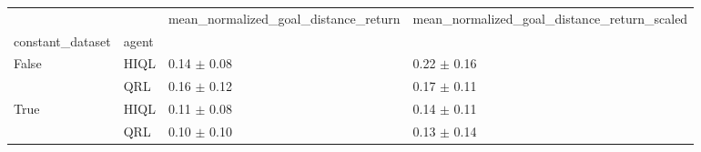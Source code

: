 \begin{tabular}{llll}
\toprule
 &  & mean_normalized_goal_distance_return & mean_normalized_goal_distance_return_scaled \\
constant_dataset & agent &  &  \\
\midrule
\multirow[t]{2}{*}{False} & HIQL & 0.14 $\pm$ 0.08 & 0.22 $\pm$ 0.16 \\
 & QRL & 0.16 $\pm$ 0.12 & 0.17 $\pm$ 0.11 \\
\cline{1-4}
\multirow[t]{2}{*}{True} & HIQL & 0.11 $\pm$ 0.08 & 0.14 $\pm$ 0.11 \\
 & QRL & 0.10 $\pm$ 0.10 & 0.13 $\pm$ 0.14 \\
\cline{1-4}
\bottomrule
\end{tabular}

